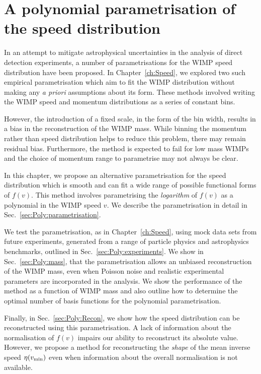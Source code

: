 \chapter{A polynomial parametrisation of the speed distribution}
\label{ch:Poly}


In an attempt to mitigate astrophysical uncertainties in the analysis of direct detection experiments, a number of parametrisations for the WIMP speed distribution have been proposed. In Chapter~\ref{ch:Speed}, we explored two such empirical parametrisation which aim to fit the WIMP distribution without making any \textit{a priori} assumptions about its form. These methods involved writing the WIMP speed and momentum distributions as a series of constant bins.

However, the introduction of a fixed scale, in the form of the bin width, results in a bias in the reconstruction of the WIMP mass. While binning the momentum rather than speed distribution helps to reduce this problem, there may remain residual bias. Furthermore, the method is expected to fail for low mass WIMPs and the choice of momentum range to parametrise may not always be clear.

In this chapter, we propose an alternative parametrisation for the speed distribution which is smooth and can fit a wide range of possible functional forms of $f(v)$. This method involves parametrising the \textit{logarithm} of $f(v)$ as a polynomial in the WIMP speed $v$. We describe the parametrisation in detail in Sec.~\ref{sec:Poly:parametrisation}.

We test the parametrisation, as in Chapter~\ref{ch:Speed}, using mock data sets from future experiments, generated from a range of particle physics and astrophysics benchmarks, outlined in Sec.~\ref{sec:Poly:experiments}. We show in Sec.~\ref{sec:Poly:mass}, that the parametrisation allows an unbiased reconstruction of the WIMP mass, even when Poisson noise and realistic experimental parameters are incorporated in the analysis. We show the performance of the method as a function of WIMP mass and also outline how to determine the optimal number of basis functions for the polynomial parametrisation.

Finally, in Sec.~\ref{sec:Poly:Recon}, we show how the speed distribution can be reconstructed using this parametrisation. A lack of information about the normalisation of $f(v)$ impairs our ability to reconstruct its absolute value. However, we propose a method for reconstructing the \textit{shape} of the mean inverse speed $\eta(\vmin)$ even when information about the overall normalisation is not available.

